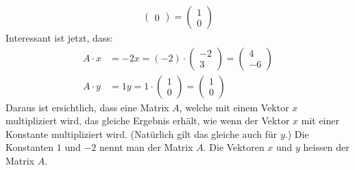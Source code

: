 \begin{beispiel}
\begin{align*}
\begin{pmatrix}
                   0
                 \end{pmatrix}
               = \begin{pmatrix}
                   1\\
                   0
                 \end{pmatrix}
  \end{align*}
  Interessant ist jetzt, dass:
  \begin{align*}
    A \cdot x &= -2x = (-2)\cdot\begin{pmatrix}
                                  -2\\
                                  3
                                \end{pmatrix}
                              = \begin{pmatrix}
                                  4\\
                                  -6
                                \end{pmatrix}\\
    A \cdot y &= 1y = 1\cdot\begin{pmatrix}
                              1\\
                              0
                            \end{pmatrix}
                          = \begin{pmatrix}
                              1\\
                              0
                            \end{pmatrix}
  \end{align*}
  Daraus ist ersichtlich, dass eine Matrix $A$, welche mit einem Vektor $x$ multipliziert wird, das gleiche Ergebnis erhält, wie wenn der Vektor $x$ mit einer Konstante multipliziert wird.  (Natürlich gilt das gleiche auch für $y$.)  Die Konstanten $1$ und $-2$ nennt man  der Matrix $A$.  Die Vektoren $x$ und $y$ heissen  der Matrix $A$.
\end{beispiel}